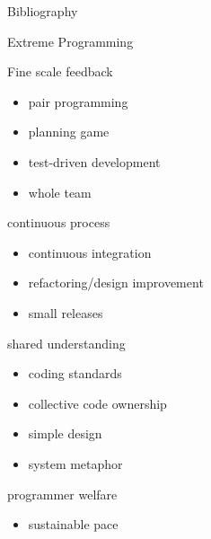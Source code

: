 \documentclass[accentcolor=tud1b]{tudbeamer}
\newcommand{\strong}[1]{\textaccentcolor{\textsf{\textbf{#1}}}}
\begin{document}
\appendix
\begin{frame}{Bibliography}
	
	
\end{frame}

\begin{frame}{Extreme Programming\\\strong{Principles}}
\label{fr:xp-principles}
	\begin{multicols}{2}
		\begin{block}{Fine scale feedback}
			\begin{itemize}
				\item pair programming
				\item planning game
				\item test-driven development
				\item whole team
			\end{itemize}
		\end{block}
		\begin{block}{continuous process}
			\begin{itemize}
				\item continuous integration
				\item refactoring/design improvement
				\item small releases
			\end{itemize}
		\end{block}
		\begin{block}{shared understanding}
			\begin{itemize}
				\item coding standards
				\item collective code ownership
				\item simple design
				\item system metaphor
			\end{itemize}
		\end{block}
		\begin{block}{programmer welfare}
			\begin{itemize}
				\item sustainable pace
			\end{itemize}
			\vspace{1cm}
		\end{block}
	\end{multicols}	
\end{frame}
\end{document}
